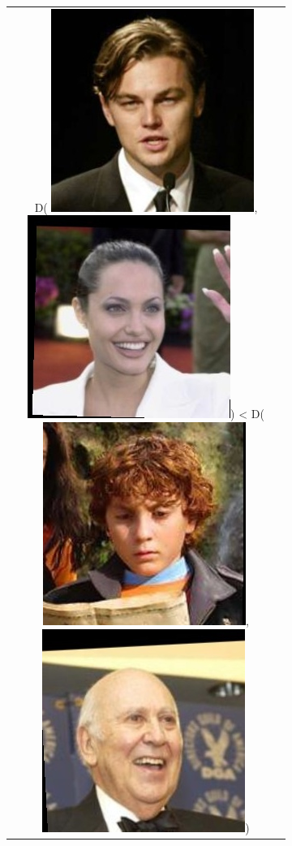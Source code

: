 \documentclass[twoside,11pt]{article}
\begin{document}
\begin{figure}[H]
\begin{subfigure}[t]{0.3\textwidth}
\begin{tabular}{c}
        D(  \includegraphics[scale=0.15]{Leonardo_DiCaprio_0001.jpg}, \includegraphics[scale=0.15]{Angelina_Jolie_0001.jpg}) <   D(\includegraphics[scale=0.15]{Daryl_Sabara_0001.jpg},  \includegraphics[scale=0.15]{Carl_Reiner_0002.jpg}) \\
\end{tabular}
    

\end{subfigure}
\end{figure}
\end{document}
